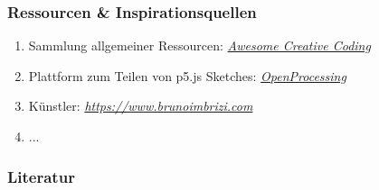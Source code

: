 \documentclass[aspectratio=169]{beamer}
\begin{document}
\begin{frame}
	\frametitle{Ressourcen \& Inspirationsquellen}
	\begin{enumerate}[label=$\bullet$]
		\item Sammlung allgemeiner Ressourcen: \textit{\href{https://github.com/terkelg/awesome-creative-coding}{Awesome Creative Coding}}
		\item Plattform zum Teilen von p5.js Sketches: \textit{\href{https://openprocessing.org}{OpenProcessing}}
		\item Künstler: \textit{\href{https://www.brunoimbrizi.com}{https://www.brunoimbrizi.com}}
		\item ...
	\end{enumerate}
\end{frame}

\appendix

\begin{frame}
	\frametitle{Literatur}
	{\scriptsize%
		
		}
\end{frame}
\end{document}
